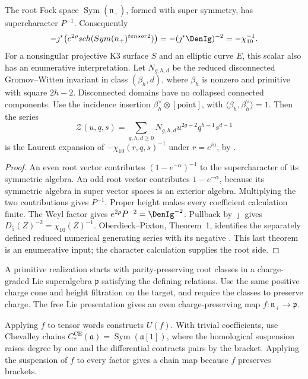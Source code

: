 \begin{theorem}
The root Fock space $\operatorname{Sym}(\mathfrak n_+)$, formed with
super symmetry, has supercharacter $P^{-1}$. Consequently
\[
 -\jmath^*\!\left(e^{2\rho}
   \operatorname{sch}(\operatorname{Sym}(\mathfrak n_+)^{\otimes2})\right)
 =-(\jmath^*\DenIg)^{-2}=-\chi_{10}^{-1}.
\]
For a nonsingular projective K3 surface $S$ and an elliptic curve $E$, this scalar also has an enumerative interpretation. Let $N_{g,h,d}$ be the reduced disconnected Gromov--Witten invariant in class $(\beta_h,d)$, where $\beta_h$ is nonzero and primitive with square $2h-2$. Disconnected domains have no collapsed connected components.
Use the incidence insertion $\beta_h^\vee\otimes[\mathrm{point}]$, with $\langle\beta_h,\beta_h^\vee\rangle=1$. Then the series
\[
 \mathcal Z(u,q,s)=\sum_{g,h,d\ge0}N_{g,h,d}u^{2g-2}q^{h-1}s^{d-1}
\]
is the Laurent expansion of $-\chi_{10}(r,q,s)^{-1}$ under $r=e^{iu}$, by \cite[Theorem~1]{OP}.
\end{theorem}
\begin{proof}
An even root vector contributes $(1-e^{-\alpha})^{-1}$ to the
supercharacter of its symmetric algebra. An odd root vector contributes
$1-e^{-\alpha}$, because its symmetric algebra in super vector spaces
is an exterior algebra. Multiplying the two contributions gives
$P^{-1}$. Proper height makes every coefficient calculation finite.
The Weyl factor gives $e^{2\rho}P^{-2}=\DenIg^{-2}$.
Pullback by $\jmath$ gives $D_5(Z)^{-2}=\chi_{10}(Z)^{-1}$.
Oberdieck--Pixton, Theorem~1, identifies the separately defined reduced numerical generating series with its negative \cite{OP}. This last theorem
is an enumerative input; the character calculation supplies the root side.
\end{proof}

A primitive realization starts with parity-preserving root classes in a charge-graded Lie superalgebra $\mathfrak p$ satisfying the defining relations. Use the same positive charge cone and height filtration on the target,
and require the classes to preserve charge. The free Lie presentation gives an even charge-preserving map $f:\mathfrak n_+\to\mathfrak p$.

Applying $f$ to tensor words constructs $U(f)$. With trivial coefficients, use Chevalley chains $C_*^{\mathrm{CE}}(\mathfrak a)=\operatorname{Sym}(\mathfrak a[1])$, where the homological suspension raises degree by one and the differential contracts pairs by the bracket. Applying the suspension of $f$ to every factor gives a chain map because $f$ preserves brackets.

